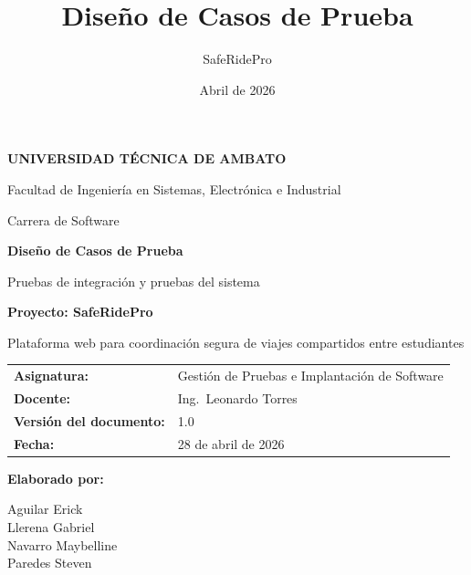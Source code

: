 \documentclass[12pt]{article}
\title{Dise\~no de Casos de Prueba}
\author{SafeRidePro}
\date{Abril de 2026}
\begin{document}
\onehalfspacing
{}

\begin{titlepage}
    \centering
    \vspace*{-3.5cm}

    \vspace{1.2cm}

    {\Large \textbf{UNIVERSIDAD T\'ECNICA DE AMBATO}\par}
    \vspace{0.2cm}
    {\normalsize Facultad de Ingenier\'ia en Sistemas, Electr\'onica e Industrial\par}
    {\normalsize Carrera de Software\par}

    \vspace{1.5cm}

    {\LARGE \textbf{Dise\~no de Casos de Prueba}\par}
    \vspace{0.4cm}
    {\Large Pruebas de integraci\'on y pruebas del sistema\par}

    \vspace{1.0cm}

    {\Large \textbf{Proyecto: SafeRidePro}\par}
    \vspace{0.3cm}
    {\normalsize Plataforma web para coordinaci\'on segura de viajes compartidos entre estudiantes\par}

    \vfill

    \begin{tabular}{P{5cm}P{8cm}}
        \textbf{Asignatura:} & Gesti\'on de Pruebas e Implantaci\'on de Software \\
        \textbf{Docente:} & Ing.\ Leonardo Torres \\
        \textbf{Versi\'on del documento:} & 1.0 \\
        \textbf{Fecha:} & 28 de abril de 2026 \\
    \end{tabular}

    \vspace{1.2cm}

    \textbf{Elaborado por:}

    \vspace{0.3cm}

    Aguilar Erick\\
    Llerena Gabriel\\
    Navarro Maybelline\\
    Paredes Steven

    \vfill
\end{titlepage}
\end{document}
